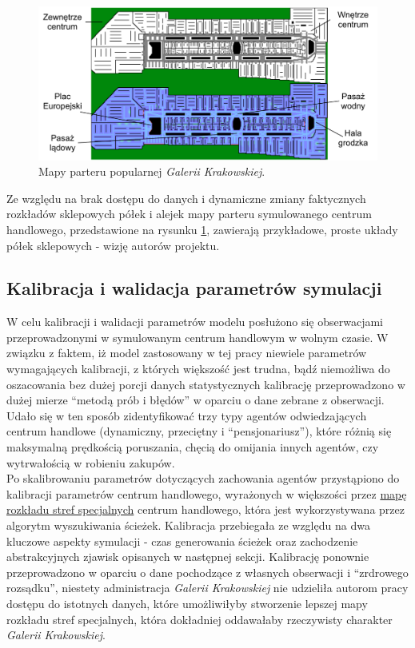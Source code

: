 \documentclass[a4paper, 12pt]{article}
\begin{document}
    \begin{figure}[H]
      \centering
      \includegraphics[scale=0.5]{./img/GaleriaKrakowska.pdf}
      \caption{Mapy parteru popularnej \emph{Galerii Krakowskiej}.}
      \label{fig:gk-maps}
    \end{figure}

    \noindent
    Ze względu na brak dostępu do danych i dynamiczne zmiany faktycznych rozkładów sklepowych półek i alejek mapy parteru symulowanego centrum handlowego, przedstawione na rysunku \ref{fig:gk-maps}, zawierają przykładowe, proste układy półek sklepowych - wizję autorów projektu. \\

        \subsection{Kalibracja i walidacja parametrów symulacji}
        \label{sec:calibration}

        W celu kalibracji i walidacji parametrów modelu posłużono się obserwacjami przeprowadzonymi w symulowanym centrum handlowym w wolnym czasie. W związku z faktem, iż model zastosowany w tej pracy niewiele parametrów wymagających kalibracji, z których większość jest trudna, bądź niemożliwa do oszacowania bez dużej porcji danych statystycznych kalibrację przeprowadzono w dużej mierze ``metodą prób i błędów'' w oparciu o dane zebrane z obserwacji. Udało się w ten sposób zidentyfikować trzy typy agentów odwiedzających centrum handlowe (dynamiczny, przeciętny i ``pensjonariusz''), które różnią się maksymalną prędkością poruszania, chęcią do omijania innych agentów, czy wytrwałością w robieniu zakupów. \\

        Po skalibrowaniu parametrów dotyczących zachowania agentów przystąpiono do kalibracji parametrów centrum handlowego, wyrażonych w większości przez \hyperref[sec:mall-features]{mapę rozkładu stref specjalnych} centrum handlowego, która jest wykorzystywana przez algorytm wyszukiwania ścieżek. Kalibracja przebiegała ze względu na dwa kluczowe aspekty symulacji - czas generowania ścieżek oraz zachodzenie abstrakcyjnych zjawisk opisanych w następnej sekcji. Kalibrację ponownie przeprowadzono w oparciu o dane pochodzące z własnych obserwacji i ``zrdrowego rozsądku'', niestety administracja \emph{Galerii Krakowskiej} nie udzieliła autorom pracy dostępu do istotnych danych, które umożliwiłyby stworzenie lepszej mapy rozkładu stref specjalnych, która dokładniej oddawałaby rzeczywisty charakter \emph{Galerii Krakowskiej}. \\
\end{document}
